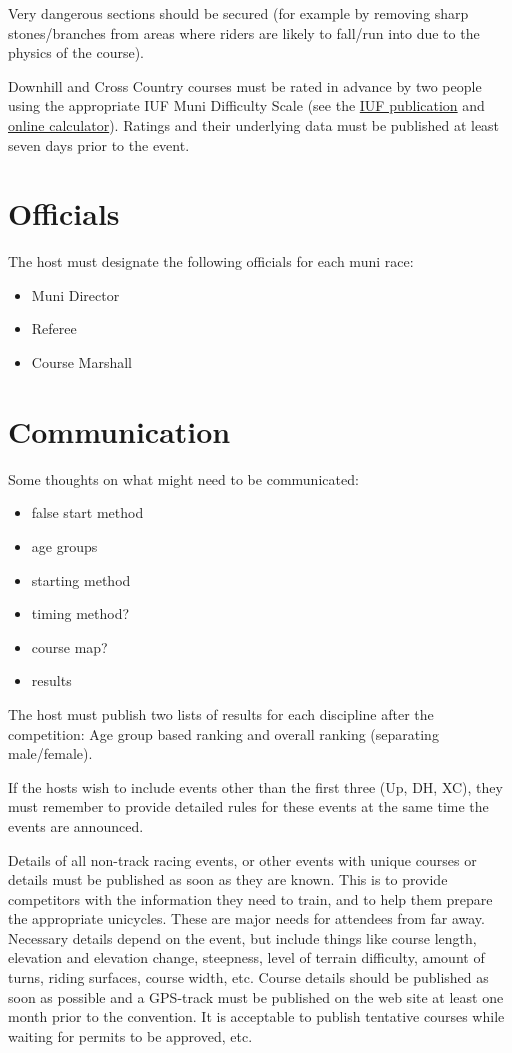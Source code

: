Very dangerous sections should be secured (for example by removing sharp stones/branches from areas where riders are likely to fall/run into due to the physics of the course).

Downhill and Cross Country courses must be rated in advance by two people using the appropriate IUF Muni Difficulty Scale (see the \href{https://unicycling.org/files/iuf-muni-difficulty-scale.pdf}{IUF publication} and \href{https://muni-scale.info/}{online calculator}).
Ratings and their underlying data must be published at least seven days prior to the event.

\section{Officials}

The host must designate the following officials for each muni race:
\begin{itemize}
\item Muni Director
\item Referee
\item Course Marshall
\end{itemize}

\section{Communication}

\begin{comment2016}
Some thoughts on what might need to be communicated:
\begin{itemize}
\item false start method
\item age groups
\item starting method
\item timing method?
\item course map?
\item results
\end{itemize}
\end{comment2016}

The host must publish two lists of results for each discipline after the competition: Age group based ranking and overall ranking (separating male/female).

If the hosts wish to include events other than the first three (Up, DH, XC), they must remember to provide detailed rules for these events at the same time the events are announced.

Details of all non-track racing events, or other events with unique courses or details must be published as soon as they are known.
This is to provide competitors with the information they need to train, and to help them prepare the appropriate unicycles.
These are major needs for attendees from far away.
Necessary details depend on the event, but include things like course length, elevation and elevation change, steepness, level of terrain difficulty, amount of turns, riding surfaces, course width, etc.
Course details should be published as soon as possible and a GPS-track must be published on the web site at least one month prior to the convention.
It is acceptable to publish tentative courses while waiting for permits to be approved, etc.

